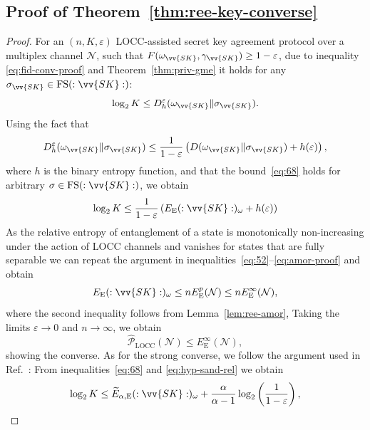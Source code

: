\documentclass[aps,pra,twocolumn,superscriptaddress,longbibliography]{revtex4-1}
\def\FS{\operatorname{FS}}
\def\E{\operatorname{E}}
\def\LOCC{\operatorname{LOCC}}
\def\({\left(}
\def\){\right)}
\newcommand{\mc}[1]{\mathcal{#1}}
\begin{document}
\begin{appendix}
\subsection{Proof of Theorem~\ref{thm:ree-key-converse}}
\begin{proof}\label{app:ree-key-converse}
For an $(n,K,\varepsilon)$ LOCC-assisted secret key agreement protocol over a multiplex channel $\mc{N}$, such that $F(\omega_{\vv{SK}},\gamma_{\vv{SK}})\geq 1-\varepsilon$, due to inequality \eqref{eq:fid-conv-proof} and Theorem~\ref{thm:priv-gme} it holds for any $\sigma_{\vv{SK}}\in\FS(:\vv{SK}:)$:
\begin{equation}\label{eq:68}
\log_2 K\leq D^\varepsilon_h(\omega_{\vv{SK}}\Vert\sigma_{\vv{SK}}). 
\end{equation}
Using the fact that~\cite{WR12}
\begin{equation}
D^\varepsilon_h(\omega_{\vv{SK}}\Vert\sigma_{\vv{SK}}) \leq \frac{1}{1-\varepsilon}\(D(\omega_{\vv{SK}}\Vert\sigma_{\vv{SK}})+h(\varepsilon)\),
\end{equation}
where $h$ is the binary entropy function, and that the bound~\eqref{eq:68} holds for arbitrary $\sigma\in\FS(:\vv{SK}:)$, we obtain
\begin{equation}\label{eq:con-ree-proof-1}
\log_2 K \leq \frac{1}{1-\varepsilon}\(E_{\E}(:\vv{SK}:)_{\omega}+h(\varepsilon)\)\end{equation}
As the relative entropy of entanglement of a state is monotonically non-increasing under the action of LOCC channels and vanishes for states that are fully separable we can repeat the argument in inequalities~\eqref{eq:52}--\eqref{eq:amor-proof} and obtain
\begin{equation}\label{eq:amor-proof_ree}
E_{\E}(:\vv{SK}:)_{\omega}\leq n E^p_{\E}(\mc{N})\leq n E^\infty_{\E}(\mc{N}),
\end{equation}
where the second inequality follows from Lemma~\ref{lem:ree-amor}, Taking the limits $\varepsilon\to0$ and $n\to\infty$, we obtain \begin{equation}
\hat{\mc{P}}_{\LOCC}(\mc{N})\leq E^\infty_{\E}(\mc{N}),
\end{equation}
showing the converse. As for the strong converse, we follow the argument used in Ref.~\cite{WTB16}: From inequalities~\eqref{eq:68} and  \eqref{eq:hyp-sand-rel} we obtain
\begin{equation}\label{eq:con-ree-proof}
\log_2 K \leq \widetilde{E}_{\alpha,\E}(:\vv{SK}:)_{\omega}+\frac{\alpha}{\alpha-1}\log_2\left(\frac{1}{1-\varepsilon}\right),
\end{equation}

\end{proof}
\end{appendix}
\end{document}
